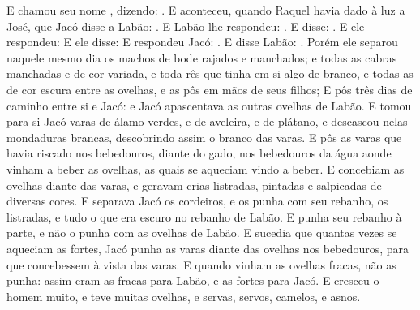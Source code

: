 {{E chamou seu nome , dizendo: .
E aconteceu, quando Raquel havia dado à luz a José, que Jacó disse a Labão: .
E Labão lhe respondeu: .
E disse: .
E ele respondeu: 
E ele disse:  E respondeu Jacó: .
E disse Labão: .
Porém ele separou naquele mesmo dia os machos de bode rajados e manchados; e todas as cabras manchadas e de cor variada, e toda rês que tinha em si algo de branco, e todas as de cor escura entre as ovelhas, e as pôs em mãos de seus filhos;
E pôs três dias de caminho entre si e Jacó: e Jacó apascentava as outras ovelhas de Labão.
E tomou para si Jacó varas de álamo verdes, e de aveleira, e de plátano, e descascou nelas mondaduras brancas, descobrindo assim o branco das varas.
E pôs as varas que havia riscado nos bebedouros, diante do gado, nos bebedouros da água aonde vinham a beber as ovelhas, as quais se aqueciam vindo a beber.
E concebiam as ovelhas diante das varas, e geravam crias listradas, pintadas e salpicadas de diversas cores.
E separava Jacó os cordeiros, e os punha com seu rebanho, os listradas, e tudo o que era escuro no rebanho de Labão. E punha seu rebanho à parte, e não o punha com as ovelhas de Labão.
E sucedia que quantas vezes se aqueciam as fortes, Jacó punha as varas diante das ovelhas nos bebedouros, para que concebessem à vista das varas.
E quando vinham as ovelhas fracas, não as punha: assim eram as fracas para Labão, e as fortes para Jacó.
E cresceu o homem muito, e teve muitas ovelhas, e servas, servos, camelos, e asnos.
\par}

}
